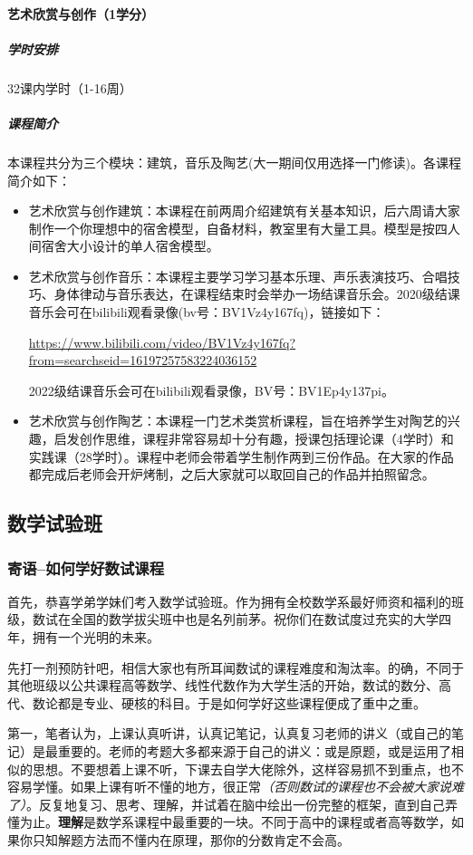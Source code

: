 \documentclass[
decoration,  %
]{qyxf-book}
\begin{document}
\paragraph{艺术欣赏与创作（1学分）}
\subparagraph{学时安排}
32课内学时（1-16周）

\subparagraph{课程简介}
本课程共分为三个模块：建筑，音乐及陶艺(大一期间仅用选择一门修读)。各课程简介如下：
\begin{itemize}
	\item 艺术欣赏与创作建筑：本课程在前两周介绍建筑有关基本知识，后六周请大家制作一个你理想中的宿舍模型，自备材料，教室里有大量工具。模型是按四人间宿舍大小设计的单人宿舍模型。
	\item 艺术欣赏与创作音乐：本课程主要学习学习基本乐理、声乐表演技巧、合唱技巧、身体律动与音乐表达，在课程结束时会举办一场结课音乐会。2020级结课音乐会可在bilibili观看录像(bv号：BV1Vz4y167fq)，链接如下：
	\par
	\url{https://www.bilibili.com/video/BV1Vz4y167fq?from=searchseid=16197257583224036152}
	\par
	2022级结课音乐会可在bilibili观看录像，BV号：BV1Ep4y137pi。
	\item 艺术欣赏与创作陶艺：本课程一门艺术类赏析课程，旨在培养学生对陶艺的兴趣，启发创作思维，课程非常容易却十分有趣，授课包括理论课（4学时）和实践课（28学时）。课程中老师会带着学生制作两到三份作品。在大家的作品都完成后老师会开炉烤制，之后大家就可以取回自己的作品并拍照留念。
\end{itemize}


\subsection{数学试验班}
\subsubsection{寄语--如何学好数试课程}

首先，恭喜学弟学妹们考入数学试验班。作为拥有全校数学系最好师资和福利的班级，数试在全国的数学拔尖班中也是名列前茅。祝你们在数试度过充实的大学四年，拥有一个光明的未来。

先打一剂预防针吧，相信大家也有所耳闻数试的课程难度和淘汰率。的确，不同于其他班级以公共课程高等数学、线性代数作为大学生活的开始，数试的数分、高代、数论都是专业、硬核的科目。于是如何学好这些课程便成了重中之重。

第一，笔者认为，上课认真听讲，认真记笔记，认真复习老师的讲义（或自己的笔记）是最重要的。老师的考题大多都来源于自己的讲义：或是原题，或是运用了相似的思想。不要想着上课不听，下课去自学大佬除外，这样容易抓不到重点，也不容易学懂。如果上课有听不懂的地方，很正常\emph{（否则数试的课程也不会被大家说难了）}。反复地复习、思考、理解，并试着在脑中绘出一份完整的框架，直到自己弄懂为止。\textbf{理解}是数学系课程中最重要的一块。不同于高中的课程或者高等数学，如果你只知解题方法而不懂内在原理，那你的分数肯定不会高。
\end{document}
